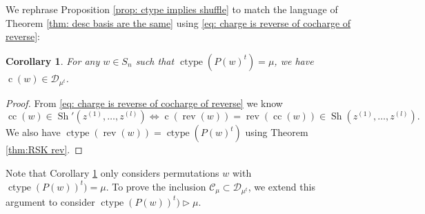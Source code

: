 \documentclass[10pt]{amsart}
\theoremstyle{plain}
\newtheorem{coro}[coro]{Corollary}
\theoremstyle{definition}
\theoremstyle{plain}
\theoremstyle{plain}
\theoremstyle{remark}
\theoremstyle{plain}
\theoremstyle{plain}
\DeclareMathOperator{\ctype}{ctype}
\DeclareMathOperator{\sh}{Sh}
\DeclareMathOperator{\rev}{rev}
\DeclareMathOperator{\cc}{cc}
\DeclareMathOperator{\cw}{c}
\begin{document}
We rephrase Proposition \ref{prop: ctype implies shuffle} to match the language of Theorem \ref{thm: desc basis are the same} using \eqref{eq: charge is reverse of cocharge of reverse}:

\begin{coro}\label{cor:ctype implies shuffle}
    For any $w\in S_n$ such that $\ctype(P(w)^t) =\mu$, we have $\cw(w)\in \mathcal{D}_{\mu^t}$.
\end{coro}
\begin{proof}
    From  \eqref{eq: charge is reverse of cocharge of reverse} we know  \[\cc(w) \in \sh'(z^{(1)},\dots , z^{(l)}) \Leftrightarrow\cw(\rev(w))= \rev(\cc(w)) \in \sh(z^{(1)},\dots , z^{(l)}).\]
    We also have $\ctype(\rev(w)) = \ctype(P(w)^t)$ using Theorem \ref{thm:RSK rev}.
\end{proof}

Note that Corollary \ref{cor:ctype implies shuffle} only considers permutations $w$ with $\ctype(P(w))^t) = \mu$. To prove the inclusion $\mathcal{C}_\mu \subset \mathcal{D}_{\mu^t}$, we extend this argument to consider $\ctype(P(w))^t) \rhd  \mu$.
\end{document}
